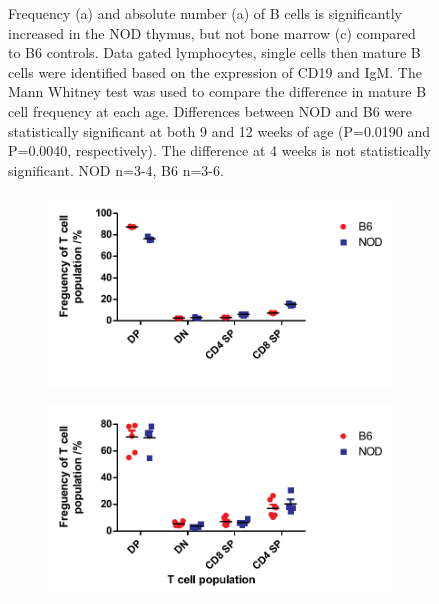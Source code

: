 \begin{figure}
\begin{subfigure}{0.5\textwidth}
	\caption{}
	\label{subfig:BMBcells}
	\end{subfigure}
\caption[NOD thymi have significantly more B cells than B6 thymi]{Frequency (a) and absolute number (a) of B cells is significantly increased in the NOD thymus, but not bone marrow (c) compared to B6 controls.
Data gated lymphocytes, single cells then mature B cells were identified based on the expression of CD19 and IgM.
The Mann Whitney test was used to compare the difference in mature B cell frequency at each age. Differences between NOD and B6 were statistically significant at both 9 and 12 weeks of age (P=0.0190 and P=0.0040, respectively). The difference at 4 weeks is not statistically significant.
NOD n=3-4, B6 n=3-6.}
\label{fig:IncthyBcells}
\end{figure}

\begin{figure}
	\begin{subfigure}{0.5\textwidth}
	\includegraphics[width=\textwidth]{Figures/4wkThyTcells.pdf}
	\caption{}
	\label{subfig:4wkThyTcells}
	\end{subfigure}
	\begin{subfigure}{0.5\textwidth}
 	\includegraphics[width=\textwidth]{Figures/9wkThyTcells.pdf}

\end{subfigure}
\end{figure}
